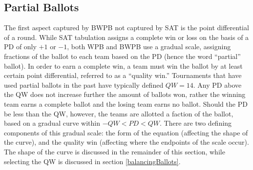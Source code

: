 \documentclass{article}
\begin{document}
\subsection{Partial Ballots}
The first aspect captured by BWPB not captured by SAT is the point differential of a round.  While SAT tabulation assigns a complete win or loss on the basis of a PD of only $+1$ or $-1$, both WPB and BWPB use a gradual scale, assigning fractions of the ballot to each team based on the PD (hence the word ``partial'' ballot).  In order to earn a complete win, a team must win the ballot by at least certain point differential, referred to as a ``quality win.'' Tournaments that have used partial ballots in the past have typically defined $QW=14$.  Any PD above the QW does not increase further the amount of ballots won, rather the winning team earns a complete ballot and the losing team earns no ballot.  Should the PD be less than the QW, however, the teams are allotted a faction of the ballot, based on a gradual curve within $-QW<PD<QW$.  There are two defining components of this gradual scale:  the form of the equation (affecting the shape of the curve), and the quality win (affecting where the endpoints of the scale occur).  The shape of the curve is discussed in the remainder of this section, while selecting the QW is discussed in section \ref{balancingBallots}.
\end{document}

